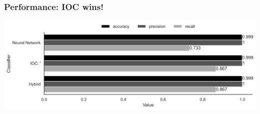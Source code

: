 \begin{frame}
\frametitle{Performance: IOC wins!}
\includegraphics[width=\textwidth]{res/combined-performance.png}
\end{frame}

